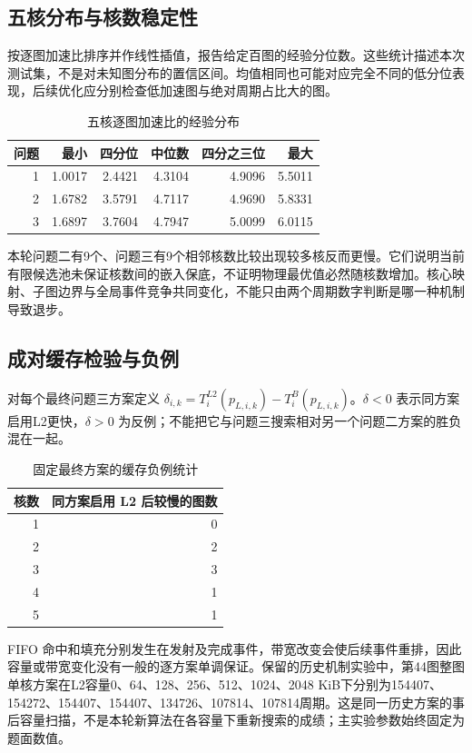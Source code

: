 \subsection{五核分布与核数稳定性}
按逐图加速比排序并作线性插值，报告给定百图的经验分位数。这些统计描述本次测试集，不是对未知图分布的置信区间。均值相同也可能对应完全不同的低分位表现，后续优化应分别检查低加速图与绝对周期占比大的图。
\begin{table}[!htbp]\centering\small
\caption{五核逐图加速比的经验分布}\label{tab:fivecore-quantiles}
\begin{tabular}{rrrrrr}
\toprule
问题 & 最小 & 四分位 & 中位数 & 四分之三位 & 最大\\
\midrule
1 & 1.0017 & 2.4421 & 4.3104 & 4.9096 & 5.5011\\
2 & 1.6782 & 3.5791 & 4.7117 & 4.9690 & 5.8331\\
3 & 1.6897 & 3.7604 & 4.7947 & 5.0099 & 6.0115\\
\bottomrule
\end{tabular}
\end{table}
本轮问题二有9个、问题三有9个相邻核数比较出现较多核反而更慢。它们说明当前有限候选池未保证核数间的嵌入保底，不证明物理最优值必然随核数增加。核心映射、子图边界与全局事件竞争共同变化，不能只由两个周期数字判断是哪一种机制导致退步。
\subsection{成对缓存检验与负例}
对每个最终问题三方案定义 $\delta_{i,k}=T^{L2}_i(p_{L,i,k})-T^B_i(p_{L,i,k})$。$\delta<0$ 表示同方案启用L2更快，$\delta>0$ 为反例；不能把它与问题三搜索相对另一个问题二方案的胜负混在一起。
\begin{table}[!htbp]\centering\small
\caption{固定最终方案的缓存负例统计}\label{tab:cache-negative}
\begin{tabular}{rr}
\toprule
核数 & 同方案启用 L2 后较慢的图数\\
\midrule
1 & 0\\
2 & 2\\
3 & 3\\
4 & 1\\
5 & 1\\
\bottomrule
\end{tabular}
\end{table}
FIFO 命中和填充分别发生在发射及完成事件，带宽改变会使后续事件重排，因此容量或带宽变化没有一般的逐方案单调保证。保留的历史机制实验中，第44图整图单核方案在L2容量0、64、128、256、512、1024、2048 KiB下分别为154407、154272、154407、154407、134726、107814、107814周期。这是同一历史方案的事后容量扫描，不是本轮新算法在各容量下重新搜索的成绩；主实验参数始终固定为题面数值。

